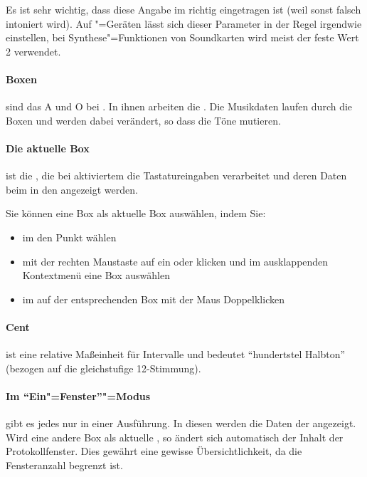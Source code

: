   Es ist sehr wichtig, dass diese Angabe im
   richtig eingetragen ist (weil
  sonst falsch intoniert wird). Auf
  "=Geräten lässt sich dieser Parameter in
  der Regel irgendwie einstellen, bei Synthese"=Funktionen von
  Soundkarten wird meist der feste Wert 2 verwendet.

\paragraph{Boxen}\label{sec:DV_BOX} sind das A und O bei
  \mutabor[~3]. In ihnen arbeiten die
  . Die Musikdaten
  laufen durch die Boxen und werden dabei verändert, so dass die Töne
  mutieren.

\paragraph{Die aktuelle Box}\label{sec:DV_CURRENTBOX} ist die
  , die bei aktiviertem
   die Tastatureingaben
  verarbeitet und deren Daten beim  in den
   angezeigt werden.

  Sie können eine Box als aktuelle Box auswählen, indem Sie:
  \begin{itemize}
  \item im  den Punkt
     wählen
  \item mit der rechten Maustaste auf ein
     oder
     klicken und im
    ausklappenden Kontextmenü eine Box auswählen
  \item im  auf der
    entsprechenden Box mit der Maus Doppelklicken
  \end{itemize}

\paragraph{Cent}\label{sec:DV_CENT} ist eine relative
  Maßeinheit für Intervalle und bedeutet "`hundertstel Halbton"'
  (bezogen auf die gleichstufige 12-Stimmung).

\paragraph{Im "`Ein"=Fenster"'"=Modus}\label{sec:DV_OWM} gibt es
  jedes  nur in einer
  Ausführung. In diesen werden die Daten der
   angezeigt. Wird
  eine andere Box als aktuelle , so ändert sich automatisch der Inhalt der
  Protokollfenster. Dies gewährt eine gewisse Übersichtlichkeit, da
  die Fensteranzahl begrenzt ist.

